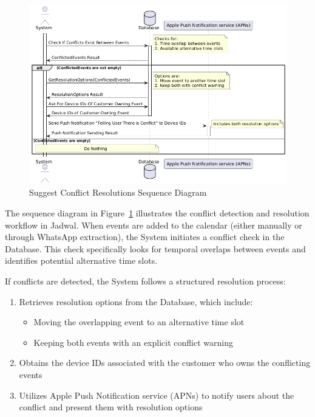 \begin{figure}[!h]
  \centering
  \includegraphics[width=\textwidth]{images/docs/diagrams/sequence-diagrams/all-sequence-diagrams/Suggest Conflict Resolutions.png}
  \caption{Suggest Conflict Resolutions Sequence Diagram}
  \label{fig:seq/suggest-conflict-resolutions}
\end{figure}

The sequence diagram in Figure~\ref{fig:seq/suggest-conflict-resolutions} illustrates the conflict detection and resolution workflow in Jadwal. When events are added to the calendar (either manually or through WhatsApp extraction), the System initiates a conflict check in the Database. This check specifically looks for temporal overlaps between events and identifies potential alternative time slots.

If conflicts are detected, the System follows a structured resolution process:
\begin{enumerate}
  \item Retrieves resolution options from the Database, which include:
        \begin{itemize}
          \item Moving the overlapping event to an alternative time slot
          \item Keeping both events with an explicit conflict warning
        \end{itemize}
  \item Obtains the device IDs associated with the customer who owns the conflicting events
  \item Utilizes Apple Push Notification service (APNs) to notify users about the conflict and present them with resolution options
\end{enumerate}

